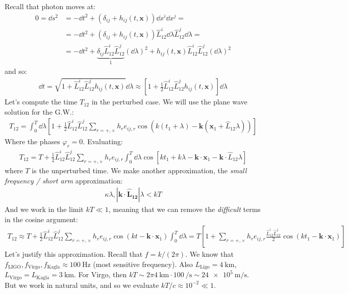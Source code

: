 \documentclass[../template.tex]{subfiles}
\begin{document}
Recall that photon moves at:
\begin{align*}
    0 = \dd{s^2}  &= - \dd{t^2} + (\delta_{ij} + h_{ij}(t, \bm{x})) \dd{x^i}\dd{x^j} =\\
    &= -\dd{t^2} + (\delta_{ij} + h_{ij}(t, \bm{x})) \hat{L}_{12}^i \dd{\lambda} \hat{L}_{12}^j \dd{\lambda} =\\
    &= -\dd{t^2} + \underbrace{\delta_{ij} \hat{L}_{12}^i \hat{L}_{12}^j}_{1} (\dd{\lambda})^2 + h_{ij}(t,\bm{x}) \hat{L}_{12}^i \hat{L}_{12}^j (\dd{\lambda})^2
\end{align*}
and so:
\begin{align*}
    \dd{t} = \sqrt{1 + \hat{L}_{12}^i \hat{L}_{12}^j h_{ij}(t,\bm{x})} \dd{\lambda} \approx \left[1+\frac{1}{2} \hat{L}_{12}^i \hat{L}_{12}^j h_{ij}(t,\bm{x}) \right]\dd{\lambda}
\end{align*}
Let's compute the time $T_{12}$ in the perturbed case. We will use the plane wave solution for the G.W.:
\begin{align*}
    T_{12} = \int_0^T \dd{\lambda} \left[1+\frac{1}{2} \hat{L}_{12}^i \hat{L}_{12}^j \sum_{r = + ,\times} h_r e_{ij,r} \cos(k(t_1+ \lambda) - \bm{k}(\bm{x}_1 + \hat{L}_{12} \lambda)) \right]
\end{align*}
Where the phases $\varphi_r = 0$. Evaluating:
\begin{align*}
    T_{12} = T + \frac{1}{2} \hat{L}_{12}^i \hat{L}_{12}^j \sum_{r = +, \times} h_r e_{ij,r} \int_0^T \dd{\lambda} \cos[kt_1 + k \lambda - \bm{k}\cdot \bm{x}_1 - \bm{k} \cdot \hat{L}_{12} \lambda] 
\end{align*}
where $T$ is the unperturbed time. We make another approximation, the \textit{small frequency / short arm} approximation:
\begin{align*}
    \kappa \lambda, |\bm{k} \cdot \bm{\hat{L}_{12}}| \lambda < kT
\end{align*} 
And we work in the limit $kT \ll 1$, meaning that we can remove the \textit{difficult} terms in the cosine argument:
\begin{align*}
    T_{12} \approx T + \frac{1}{2} \hat{L}_{12}^i \hat{L}_{12}^j \sum_{r = +, \times} h_r e_{ij,r} \cos(kt - \bm{k}\cdot \bm{x}_1) \int_0^T \dd{\lambda} = T\left[1+ \sum_{r = +,\times} h_r e_{ij,r} \frac{\hat{L}_{12}^i \hat{L}_{12}^j}{2} \cos(k t_1 - \bm{k} \cdot \bm{x}_1)\right] 
\end{align*}  
Let's justify this approximation. Recall that $f=k/(2\pi)$. We know that $f_{\mathrm{LIGO}}, f_{\mathrm{Virgo}}, f_{\mathrm{Kagla}} \approx \SI{100}{\hertz}$ (most sensitive frequency). Also $L_{\mathrm{Ligo}} = \SI{4}{\kilo\m}$, $L_{\mathrm{Virgo}} = L_{\mathrm{Kagla}} = \SI{3}{\kilo\m}$. For Virgo, then $kT \sim 2\pi \SI{4}{\kilo\m} \cdot \SI{100}{\per\s} \sim \SI{24e5}{\m\per\s}$. But we work in natural units, and so we evaluate $kT/c \approx 10^{-2} \ll 1$. 
\end{document}
